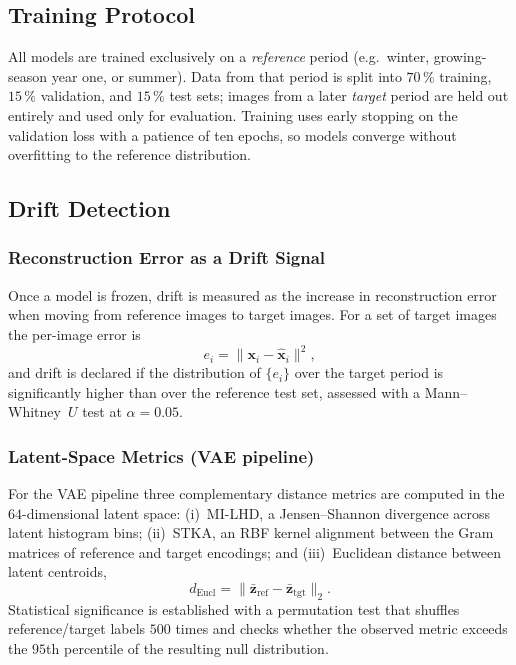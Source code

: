 \subsection{Training Protocol}

All models are trained exclusively on a \emph{reference} period (e.g.\ winter,
growing-season year one, or summer). Data from that period is split into
$70\,\%$ training, $15\,\%$ validation, and $15\,\%$ test sets; images from a
later \emph{target} period are held out entirely and used only for evaluation.
Training uses early stopping on the validation loss with a patience of ten epochs, so
models converge without overfitting to the reference distribution.

\subsection{Drift Detection}

\subsubsection{Reconstruction Error as a Drift Signal}
Once a model is frozen, drift is measured as the increase in reconstruction error when
moving from reference images to target images. For a set of target images the
per-image error is
\begin{equation}
    e_i = \bigl\|\mathbf{x}_i - \hat{\mathbf{x}}_i\bigr\|^2,
    \label{eq:per_image_error}
\end{equation}
and drift is declared if the distribution of $\{e_i\}$ over the target period is
significantly higher than over the reference test set, assessed with a
Mann--Whitney~$U$ test at $\alpha=0.05$.

\subsubsection{Latent-Space Metrics (VAE pipeline)}
For the VAE pipeline three complementary distance metrics are computed in the
$64$-dimensional latent space: (i)~MI-LHD, a Jensen--Shannon divergence across latent
histogram bins; (ii)~STKA, an RBF kernel alignment between the Gram matrices of
reference and target encodings; and (iii)~Euclidean distance between latent centroids,
\begin{equation}
    d_\text{Eucl} = \bigl\|\bar{\mathbf{z}}_\text{ref}
                           - \bar{\mathbf{z}}_\text{tgt}\bigr\|_2.
    \label{eq:eucl}
\end{equation}
Statistical significance is established with a permutation test that shuffles
reference/target labels $500$ times and checks whether the observed metric exceeds the
$95$th percentile of the resulting null distribution.

